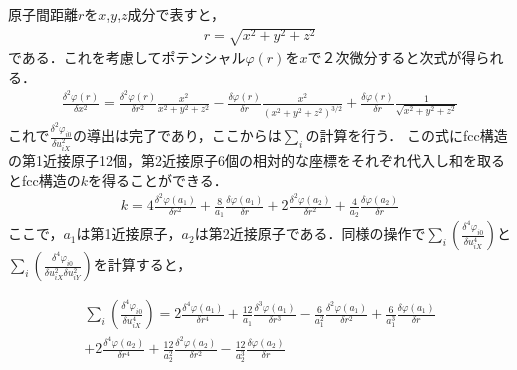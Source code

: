 原子間距離$r$を$x$,$y$,$z$成分で表すと，
\begin{eqnarray}
\label{eq:moment20}
r=\sqrt{x^2+y^2+z^2}
\end{eqnarray}
である．これを考慮してポテンシャル$\varphi(r)$を$x$で２次微分すると次式が得られる．
\begin{eqnarray}
\label{eq:moment21}
\frac{\delta^2\varphi(r)}{\delta x^2}=
\frac{\delta^2 \varphi(r)}{\delta r^2} \frac{x^2}{x^2+y^2+z^2}
-\frac{\delta \varphi(r)}{\delta r} \frac{x^2}{(x^2+y^2+z^2)^{3/2}}
+\frac{\delta \varphi(r)}{\delta r} \frac{1}{\sqrt{x^2+y^2+z^2}}
\end{eqnarray}
これで$\frac{\delta^2\varphi_{i0}}{\delta u_{iX}^2}$の導出は完了であり，ここからは$\sum_i$の計算を行う．
この式にfcc構造の第1近接原子12個，第2近接原子6個の相対的な座標をそれぞれ代入し和を取るとfcc構造の$k$を得ることができる．
\begin{eqnarray}
\label{eq:momentk}
k=
4\frac{\delta^2 \varphi(a_1)}{\delta r^2}
+\frac{8}{a_1}\frac{\delta \varphi(a_1)}{\delta r}
+2\frac{\delta^2 \varphi(a_2)}{\delta r^2}
+\frac{4}{a_2}\frac{\delta \varphi(a_2)}{\delta r}
\end{eqnarray}
ここで，$a_1$は第1近接原子，$a_2$は第2近接原子である．同様の操作で$\sum_i\left(\frac{\delta^4\varphi_{i0}}{\delta u_{iX}^4}\right)$と
$\sum_i\left(\frac{\delta^4\varphi_{i0}}{\delta u_{iX}^2\delta u_{iY}^2}\right)$を計算すると，

\begin{eqnarray}
\label{eq:moment22}
\sum_i \left( \frac{\delta^4\varphi_{i0}}{\delta u_{iX}^4} \right)=
2\frac{\delta^4 \varphi(a_1)}{\delta r^4}
+\frac{12}{a_1}\frac{\delta^3 \varphi(a_1)}{\delta r^3}
-\frac{6}{a_1^2}\frac{\delta^2 \varphi(a_1)}{\delta r^2}
+\frac{6}{a_1^3}\frac{\delta \varphi(a_1)}{\delta r}\nonumber\\
+2\frac{\delta^4 \varphi(a_2)}{\delta r^4}
+\frac{12}{a_2^2}\frac{\delta^2 \varphi(a_2)}{\delta r^2}
-\frac{12}{a_2^3}\frac{\delta \varphi(a_2)}{\delta r}
\end{eqnarray}

